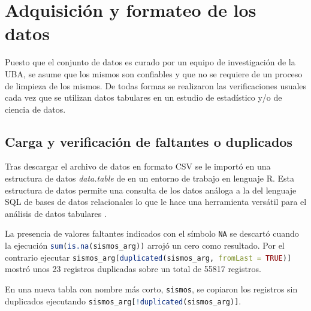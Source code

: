 \documentclass[a4paper]{report}
\begin{document}
\section{Adquisición y formateo de los datos}

Puesto que el conjunto de datos es curado por un equipo de investigación de la UBA, se asume que los mismos son confiables y que no se requiere de un proceso de limpieza de los mismos.
De todas formas se realizaron las verificaciones usuales cada vez que se utilizan datos tabulares en un estudio de estadístico y/o de ciencia de datos.


\subsection{Carga y verificación de faltantes o duplicados}
Tras descargar el archivo de datos en formato CSV se le importó en una estructura de datos \emph{data.table} de en un entorno de trabajo en lenguaje R.
Esta estructura de datos permite una consulta de los datos análoga a la del lenguaje SQL de bases de datos relacionales lo que le hace una herramienta versátil para el análisis de datos tabulares \cite{noauthor_introduction_2024}.

La presencia de valores faltantes indicados con el símbolo \verb'NA' se descartó cuando la ejecución \lstinline[language=R,breaklines=true,basicstyle=\ttfamily]'sum(is.na(sismos_arg))' arrojó un cero como resultado.
Por el contrario ejecutar \lstinline[language=R,breaklines=true,basicstyle=\ttfamily]!sismos_arg[duplicated(sismos_arg, fromLast = TRUE)]! mostró unos \num{23} registros duplicadas sobre un total de \num{55817} registros.

En una nueva tabla con nombre más corto, \lstinline[language=R,breaklines=true,basicstyle=\ttfamily]'sismos', se copiaron los registros sin duplicados ejecutando \lstinline[language=R,breaklines=true,basicstyle=\ttfamily]'sismos_arg[!duplicated(sismos_arg)]'.
\end{document}
